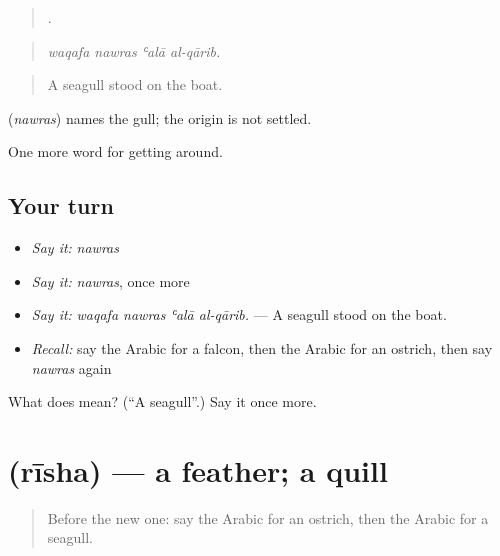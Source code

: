 \begin{quote}
   .
\end{quote}

\begin{quote}
\emph{waqafa nawras ʿalā al-qārib.}
\end{quote}

\begin{quote}
A seagull stood on the boat.
\end{quote}

\begin{cousinweb}
\textbf{} (\emph{nawras}) names the gull; the origin is not settled.
\end{cousinweb}

\begin{grammarlens}[title={What you've built}]
One more word for getting around.
\end{grammarlens}

\subsection*{Your turn}
\begin{itemize}
\raggedright
  \item \emph{Say it:} \emph{nawras}
  \item \emph{Say it:} \emph{nawras}, once more
  \item \emph{Say it:} \emph{waqafa nawras ʿalā al-qārib.} — A seagull stood on the boat.
  \item \emph{Recall:} say the Arabic for a falcon, then the Arabic for an ostrich, then say \emph{nawras} again
\end{itemize}

\begin{tcolorbox}[breakable,colback=teal!4,colframe=teal!35!black,title={Before you move on}]
What does  mean? (\textquotedblleft{}A seagull\textquotedblright{}.) Say it once more.
\end{tcolorbox}
\section[\texorpdfstring{\ar{ريشة} (rīsha)}{ريشة (rīsha)}]{ (rīsha) — a feather; a quill}

\label{lesson:AR-C474-risha}



\begin{quote}
Before the new one: say the Arabic for an ostrich, then the Arabic for a seagull.
\end{quote}

